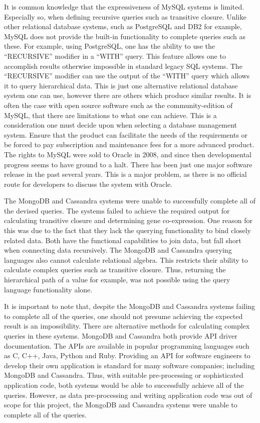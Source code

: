 \begin{addmargin}[2em]{0pt}
It is common knowledge that the expressiveness of MySQL systems is limited. Especially so, when defining recursive queries such as transitive closure. Unlike other relational database systems, such as PostgreSQL and DB2 for example, MySQL does not provide the built-in functionality to complete queries such as these. For example, using PostgreSQL, one has the ability to use the ``RECURSIVE'' modifier in a ``WITH'' query. This feature allows one to accomplish results otherwise impossible in standard legacy SQL systems. The ``RECURSIVE'' modifier can use the output of the ``WITH'' query which allows it to query hierarchical data. This is just one alternative relational database system one can use, however there are others which produce similar results. It is often the case with open source software such as the community-edition of MySQL, that there are limitations to what one can achieve. This is a consideration one must decide upon when selecting a database management system. Ensure that the product can facilitate the needs of the requirements or be forced to pay subscription and maintenance fees for a more advanced product. The rights to MySQL were sold to Oracle in 2008, and since then developmental progress seems to have ground to a halt. There has been just one major software release in the past several years. This is a major problem, as there is no official route for developers to discuss the system with Oracle.

The MongoDB and Cassandra systems were unable to successfully complete all of the devised queries. The systems failed to achieve the required output for calculating transitive closure and determining gene co-expression. One reason for this was due to the fact that they lack the querying functionality to bind closely related data. Both have the functional capabilities to join data, but fall short when connecting data recursively. The MongoDB and Cassandra querying languages also cannot calculate relational algebra. This restricts their ability to calculate complex queries such as transitive closure. Thus, returning the hierarchical path of a value for example, was not possible using the query language functionality alone.

It is important to note that, despite the MongoDB and Cassandra systems failing to complete all of the queries, one should not presume achieving the expected result is an impossibility. There are alternative methods for calculating complex queries in these systems. MongoDB and Cassandra both provide API driver documentation. The APIs are available in popular programming languages such as C, C++, Java, Python and Ruby. Providing an API for software engineers to develop their own application is standard for many software companies; including MongoDB and Cassandra. Thus, with suitable pre-processing or sophisticated application code, both systems would be able to successfully achieve all of the queries. However, as data pre-processing and writing application code was out of scope for this project, the MongoDB and Cassandra systems were unable to complete all of the queries.\\[0.5em]
\end{addmargin}

